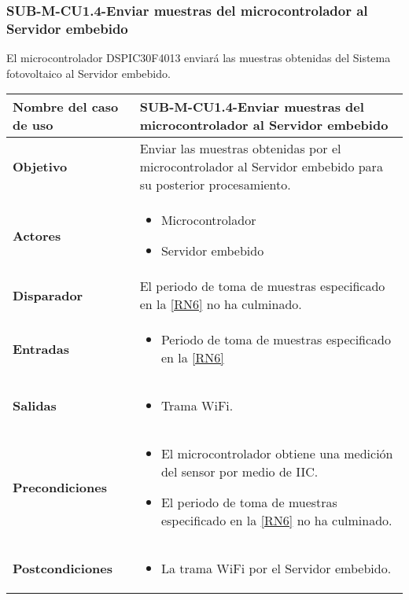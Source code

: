 %
\subsubsection{SUB-M-CU1.4-Enviar muestras del microcontrolador al Servidor embebido}\label{SUB-M-CU1.4}
El microcontrolador DSPIC30F4013 enviará las muestras obtenidas del Sistema fotovoltaico al Servidor embebido.
\begin{longtable}{|J{5cm}|J{10.3cm}|}
	\hline
	\textbf{Nombre del caso de uso} &
		SUB-M-CU1.4-Enviar muestras del microcontrolador al Servidor embebido \\ \hline
	\textbf{Objetivo} &
		Enviar las muestras obtenidas por el  microcontrolador al Servidor embebido para su posterior procesamiento. \\ \hline
	\textbf{Actores} &
	    \begin{itemize}
		    \item Microcontrolador
		    \item Servidor embebido
		\end{itemize}\\ \hline 
	\textbf{Disparador} & 
		El periodo de toma de muestras especificado en la \ref{RN6} no ha culminado.\\ \hline 
	\textbf{Entradas} & 
		\begin{itemize}
				\item Periodo de toma de muestras especificado en la \ref{RN6}
		\end{itemize}\\ \hline 
	\textbf{Salidas} & 
	    \begin{itemize}
	        \item Trama WiFi.
	    \end{itemize}\\ \hline
	\textbf{Precondiciones} & 
		\begin{itemize}
		    \item El microcontrolador obtiene una medición del sensor por medio de IIC.
		    \item El periodo de toma de muestras especificado en la \ref{RN6} no ha culminado.
		\end{itemize}\\ \hline
	\textbf{Postcondiciones} &
		\begin{itemize}
			\item La trama WiFi por el Servidor embebido.
		\end{itemize} \\ \hline

\end{longtable}

